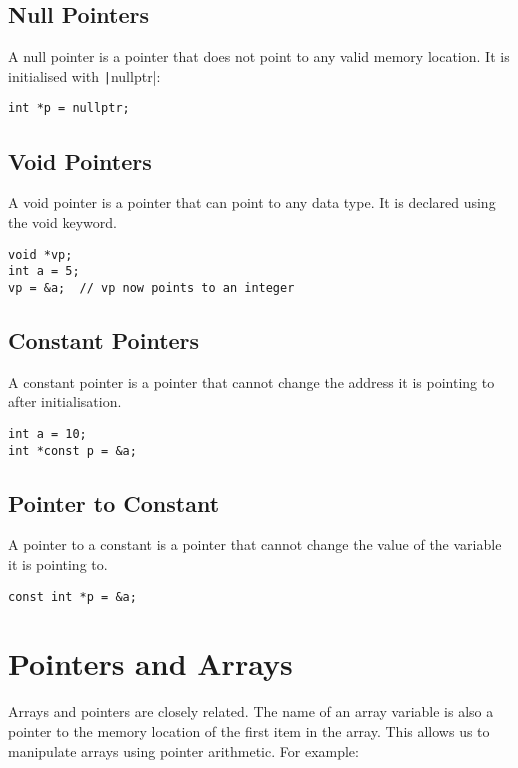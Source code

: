 \documentclass{article}
\begin{document}
\subsection{Null Pointers}
A null pointer is a pointer that does not point to any valid memory location. It is initialised with  \texttt|nullptr|:

\begin{verbatim}
int *p = nullptr;
\end{verbatim}

\subsection{Void Pointers}
A void pointer is a pointer that can point to any data type. It is declared using the void keyword.

\begin{verbatim}
void *vp;
int a = 5;
vp = &a;  // vp now points to an integer
\end{verbatim}

\subsection{Constant Pointers}
A constant pointer is a pointer that cannot change the address it is pointing to after initialisation.

\begin{verbatim}
int a = 10;
int *const p = &a;
\end{verbatim}

\subsection{Pointer to Constant}
A pointer to a constant is a pointer that cannot change the value of the variable it is pointing to.

\begin{verbatim}
const int *p = &a;
\end{verbatim}

\section{Pointers and Arrays}
Arrays and pointers are closely related. The name of an array variable is also a pointer to the memory location of the first item in the array. This allows us to manipulate arrays using pointer arithmetic. For example:
\end{document}
